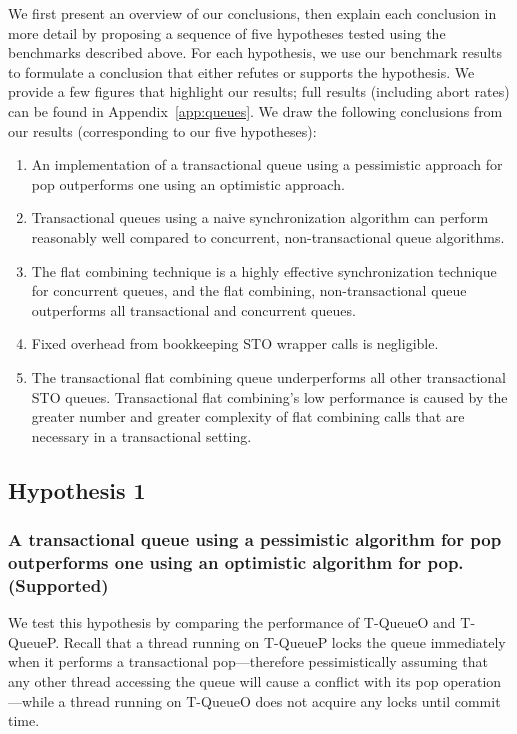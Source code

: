 We first present an overview of our conclusions, then explain each conclusion in more detail by proposing a sequence of five hypotheses tested using the benchmarks described above. For each hypothesis, we use our benchmark results to formulate a conclusion that either refutes or supports the hypothesis.
We provide a few figures that highlight our results; full results (including abort rates) can be found in Appendix~\ref{app:queues}. We draw the following conclusions from our results (corresponding to our five hypotheses):
\begin{enumerate}
    \item An implementation of a transactional queue using a pessimistic approach for pop outperforms one using an optimistic approach.
    \item Transactional queues using a naive synchronization algorithm can perform reasonably well compared to concurrent, non-transactional queue algorithms.
    \item The flat combining technique is a highly effective synchronization technique for concurrent queues, and the flat combining, non-transactional queue outperforms all transactional and concurrent queues.
    \item Fixed overhead from bookkeeping STO wrapper calls is negligible.
    \item The transactional flat combining queue underperforms all other transactional STO queues. Transactional flat combining's low performance is caused by the greater number and greater complexity of flat combining calls that are necessary in a transactional setting.
\end{enumerate}

\subsection[Hypothesis 1]{Hypothesis 1}
\subsubsection{A transactional queue using a pessimistic algorithm for pop outperforms one using an optimistic algorithm for pop. (Supported)}

We test this hypothesis by comparing the performance of T-QueueO and T-QueueP. Recall that a thread running on T-QueueP locks the queue immediately when it performs a transactional pop---therefore pessimistically assuming that any other thread accessing the queue will cause a conflict with its pop operation---while a thread running on T-QueueO does not acquire any locks until commit time.

